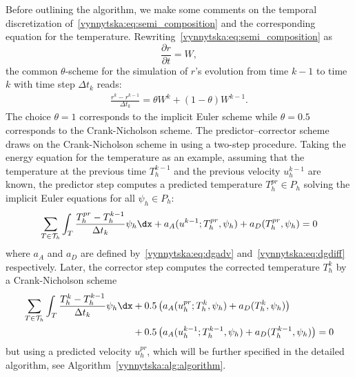 Before outlining the algorithm, we make some comments on the temporal
discretization of~\eqref{vynnytska:eq:semi_composition} and the
corresponding equation for the
temperature. Rewriting~\eqref{vynnytska:eq:semi_composition} as
\begin{equation}
  \frac{\partial r}{\partial t} = W,
\end{equation}
the common $\theta$-scheme for the simulation of $r$'s evolution from
time $k-1$ to time $k$ with time step $\Delta t_k$ reads:
\begin{align}
  \label{vynnytska:eq:thetascheme}
  \frac{r^k - r^{k-1}}{\Delta t_k} = \theta W^k + (1 - \theta) W^{k-1}.
\end{align}
The choice $\theta = 1$ corresponds to the implicit Euler scheme while
$\theta = 0.5$ corresponds to the Crank-Nicholson scheme. The
predictor--corrector scheme draws on the Crank-Nicholson scheme in
using a two-step procedure. Taking the energy equation for the
temperature as an example, assuming that the temperature at the
previous time $T_h^{k-1}$ and the previous velocity $u_h^{k-1}$ are
known, the predictor step computes a predicted temperature $T_h^{pr}
\in P_h$ solving the implicit Euler equations for all $\psi_h \in
P_h$:
\begin{equation}
  \label{vynnytska:eq:predictor}
  \sum_{T \in \mathcal{T}_h}
  \int_T \frac{T_h^{pr} - T_h^{k-1}}{\Delta t_k} \psi_h \dx
  + a_{A} (u^{k-1}; T_h^{pr}, \psi_h) + a_D (T_h^{pr}, \psi_h) = 0
\end{equation}
 where $a_A$ and $a_D$ are defined
by~\eqref{vynnytska:eq:dgadv} and~\eqref{vynnytska:eq:dgdiff}
respectively. Later, the corrector step computes the corrected
temperature $T_h^k$ by a Crank-Nicholson scheme
\begin{equation}
  \label{vynnytska:eq:corrector}
  \begin{split}
    \sum_{T \in \mathcal{T}_h}
    \int_T \frac{T_h^k - T_h^{k-1}}{\Delta t_k} \psi_h \dx
    &+ 0.5 \left( a_{A} (u_h^{pr}; T_h^{k}, \psi_h)
    + a_D (T_h^{k}, \psi_h) \right) \\
    &+ 0.5 \left( a_{A} (u_h^{k-1}; T_h^{k-1}, \psi_h)
    + a_D (T_h^{k-1}, \psi_h) \right) = 0
  \end{split}
\end{equation}
but using a predicted velocity $u_h^{pr}$, which will be further
specified in the detailed algorithm, see
Algorithm~\ref{vynnytska:alg:algorithm}.
